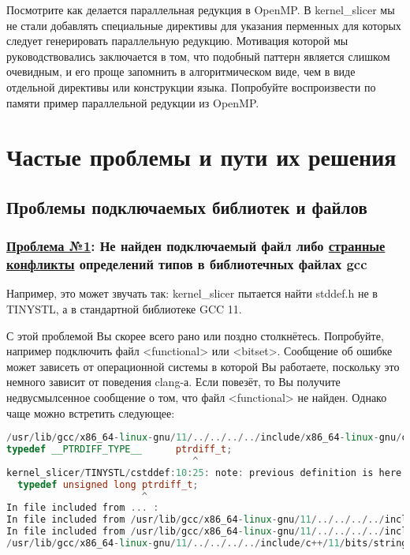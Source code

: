 \documentclass[11pt,fleqn,english,russian]{report} %
\begin{document}
\begin{remark}
Посмотрите как делается параллельная редукция в OpenMP. В kernel\_slicer мы не стали добавлять специальные директивы для указания перменных для которых следует генерировать параллельную редукцию. Мотивация которой мы руководствовались заключается в том, что подобный паттерн является слишком очевидным, и его проще запомнить в алгоритмическом виде, чем в виде отдельной директивы или конструкции языка. Попробуйте воспроизвести по памяти пример параллельной редукции из OpenMP. 
\end{remark}

\chapter{Частые проблемы и пути их решения}

\section{Проблемы подключаемых библиотек и файлов}

\subsection{\underline{Проблема №1}: Не найден подключаемый файл либо \underline{странные конфликты} определений типов в библиотечных файлах gcc}

Например, это может звучать так: kernel\_slicer пытается найти stddef.h не в TINYSTL, а в стандартной библиотеке GCC 11. 

С этой проблемой Вы скорее всего рано или поздно столкнётесь. Попробуйте, например подключить  файл <functional> или <bitset>. Сообщение об ошибке может зависеть от операционной системы в которой Вы работаете, поскольку это немного зависит от поведения clang-а. Если повезёт, то Вы получите недвусмылсенное сообщение о том, что файл <functional> не найден. Однако чаще можно встретить следующее:

\begin{lstlisting}[language=C++, 
	caption=ошибка из-за ненайденного файла bitset из STL, 
	label=lst:filenotfound]	
/usr/lib/gcc/x86_64-linux-gnu/11/../../../../include/x86_64-linux-gnu/c++/11/bits/c++config.h:281:28: error: typedef redefinition with different types ('long' vs 'unsigned long')
typedef __PTRDIFF_TYPE__      ptrdiff_t;
                                 ^
kernel_slicer/TINYSTL/cstddef:10:25: note: previous definition is here
  typedef unsigned long ptrdiff_t;
                        ^
In file included from ... :
In file included from /usr/lib/gcc/x86_64-linux-gnu/11/../../../../include/c++/11/bitset:50:
In file included from /usr/lib/gcc/x86_64-linux-gnu/11/../../../../include/c++/11/iosfwd:39:
/usr/lib/gcc/x86_64-linux-gnu/11/../../../../include/c++/11/bits/stringfwd.h:79:33: error: typedef redefinition with different types ('basic_string<char>' vs 'str::string_base<char>')
\end{lstlisting}
\end{document}
